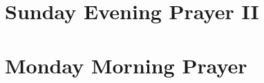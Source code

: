 \newpage

\section{Sunday Evening Prayer II}

{%
\parindent 0pt
\noindent
\ifx\preLilyPondExample \undefined
\else
  \expandafter\preLilyPondExample
\fi
\def\lilypondbook{}%

\ifx\postLilyPondExample \undefined
\else
  \expandafter\postLilyPondExample
\fi
}

\null\medskip{%
\parindent 0pt
\noindent
\ifx\preLilyPondExample \undefined
\else
  \expandafter\preLilyPondExample
\fi
\def\lilypondbook{}%

\ifx\postLilyPondExample \undefined
\else
  \expandafter\postLilyPondExample
\fi
}

\newpage

{%
\parindent 0pt
\noindent
\ifx\preLilyPondExample \undefined
\else
  \expandafter\preLilyPondExample
\fi
\def\lilypondbook{}%

\ifx\postLilyPondExample \undefined
\else
  \expandafter\postLilyPondExample
\fi
}

\null\medskip{%
\parindent 0pt
\noindent
\ifx\preLilyPondExample \undefined
\else
  \expandafter\preLilyPondExample
\fi
\def\lilypondbook{}%

\ifx\postLilyPondExample \undefined
\else
  \expandafter\postLilyPondExample
\fi
}

\newpage

{%
\parindent 0pt
\noindent
\ifx\preLilyPondExample \undefined
\else
  \expandafter\preLilyPondExample
\fi
\def\lilypondbook{}%

\ifx\postLilyPondExample \undefined
\else
  \expandafter\postLilyPondExample
\fi
}

\null\medskip{%
\parindent 0pt
\noindent
\ifx\preLilyPondExample \undefined
\else
  \expandafter\preLilyPondExample
\fi
\def\lilypondbook{}%

\ifx\postLilyPondExample \undefined
\else
  \expandafter\postLilyPondExample
\fi
}

\newpage
\null\newpage

\section{Monday Morning Prayer}

{%
\parindent 0pt
\noindent
\ifx\preLilyPondExample \undefined
\else
  \expandafter\preLilyPondExample
\fi
\def\lilypondbook{}%

\ifx\postLilyPondExample \undefined
\else
  \expandafter\postLilyPondExample
\fi
}

